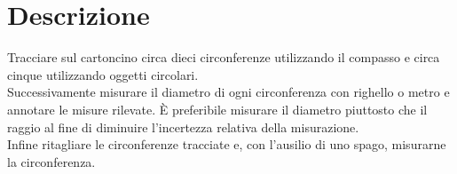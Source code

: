 \section*{Descrizione}

Tracciare sul cartoncino circa dieci circonferenze utilizzando il compasso e circa cinque utilizzando oggetti circolari.\\
Successivamente misurare il diametro di ogni circonferenza con righello o metro e annotare le misure rilevate.
È preferibile misurare il diametro piuttosto che il raggio al fine di diminuire l'incertezza relativa della misurazione.\\
Infine ritagliare le circonferenze tracciate e, con l'ausilio di uno spago, misurarne la circonferenza.
